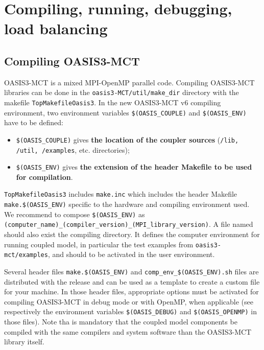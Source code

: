 \newpage
%

\chapter{Compiling, running, debugging, load balancing}
\label{sec_compilationrunning}

\section{Compiling OASIS3-MCT}
\label{subsec_compile}

OASIS3-MCT is a mixed MPI-OpenMP parallel code. Compiling OASIS3-MCT libraries can be done
in the {\tt oasis3-MCT/util/make\_dir} directory
with the makefile {\tt TopMakefileOasis3}.
In the new OASIS3-MCT v6 compiling environment,
two environment variables {\tt \$(OASIS\_COUPLE)} and {\tt \$(OASIS\_ENV)} have to be defined:
\begin{itemize}
\item {\tt \$(OASIS\_COUPLE)} gives {\bf the location of the coupler sources} ({\tt /lib, /util, /examples}, etc. directories); 
\item {\tt \$(OASIS\_ENV)} gives {\bf the extension of the header Makefile to be used for compilation}.
\end{itemize}
{\tt TopMakefileOasis3} includes {\tt make.inc}
which includes the header Makefile {\tt make.\$(OASIS\_ENV)} specific to the hardware and compiling environment used. 
We recommend to compose {\tt \$(OASIS\_ENV)} as {\tt (computer\_name)\_(compiler\_version)\_(MPI\_library\_version)}. A file named  should also exist the compiling directory. It defines the computer environment for running coupled model, in particular the test examples from {\tt oasis3-mct/examples}, and should to be activated in the user environment.

Several header files {\tt make.\$(OASIS\_ENV)} and {\tt comp\_env\_\$(OASIS\_ENV).sh} files are distributed with the release and can be used as
a template to create a custom file for your machine. In those header files, appropriate options must be activated for compiling OASIS3-MCT in debug mode or with OpenMP, when applicable (see respectively the environment variables {\tt \$(OASIS\_DEBUG)} and {\tt \$(OASIS\_OPENMP)} in those files).
Note tha is mandatory that the coupled model components be compiled with the same compilers and system software than the OASIS3-MCT library itself.

